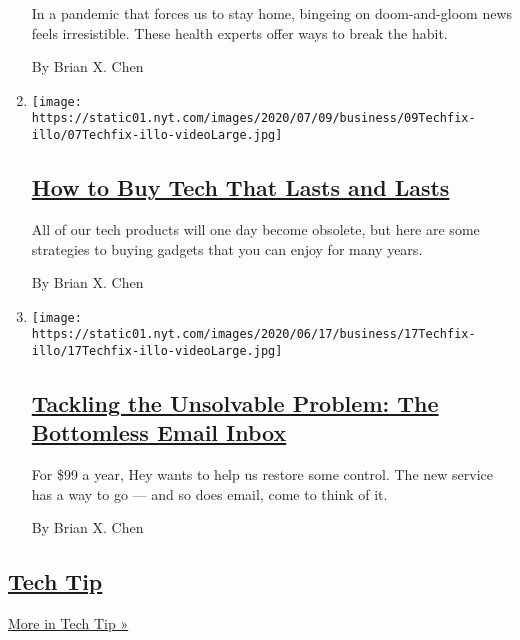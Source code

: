 \begin{enumerate}
  In a pandemic that forces us to stay home, bingeing on doom-and-gloom
  news feels irresistible. These health experts offer ways to break the
  habit.

  By Brian X. Chen
\item
  \texttt{[image: https://static01.nyt.com/images/2020/07/09/business/09Techfix-illo/07Techfix-illo-videoLarge.jpg]}

  \hypertarget{how-to-buy-tech-that-lasts-and-lasts}{%
  \subsection{\texorpdfstring{\href{/2020/07/08/technology/personaltech/tech-that-lasts.html}{How
  to Buy Tech That Lasts and
  Lasts}}{How to Buy Tech That Lasts and Lasts}}\label{how-to-buy-tech-that-lasts-and-lasts}}

  All of our tech products will one day become obsolete, but here are
  some strategies to buying gadgets that you can enjoy for many years.

  By Brian X. Chen
\item
  \texttt{[image: https://static01.nyt.com/images/2020/06/17/business/17Techfix-illo/17Techfix-illo-videoLarge.jpg]}

  \hypertarget{tackling-the-unsolvable-problem-the-bottomless-email-inbox}{%
  \subsection{\texorpdfstring{\href{/2020/06/17/technology/personaltech/hey-email-service-screening.html}{Tackling
  the Unsolvable Problem: The Bottomless Email
  Inbox}}{Tackling the Unsolvable Problem: The Bottomless Email Inbox}}\label{tackling-the-unsolvable-problem-the-bottomless-email-inbox}}

  For \$99 a year, Hey wants to help us restore some control. The new
  service has a way to go --- and so does email, come to think of it.

  By Brian X. Chen
\end{enumerate}

\hypertarget{tech-tip}{%
\subsection{\texorpdfstring{\href{/column/tech-tip}{Tech
Tip}}{Tech Tip}}\label{tech-tip}}

\href{/column/tech-tip}{More in Tech Tip »}

